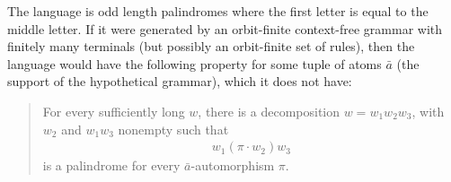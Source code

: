 	

	
	




	

 {The language is odd length palindromes where the first letter is equal to the middle letter. If it were generated by an orbit-finite context-free grammar with finitely many terminals (but possibly an orbit-finite set of rules), then the language would have the following property for some tuple of atoms $\bar a$ (the support of the hypothetical grammar), which it does not have:
	  \begin{quote}
	  	For every sufficiently long  $w$, there is a decomposition $w=w_1 w_2 w_3$, with $w_2$ and $w_1w_3$ nonempty  such that
	\begin{align*}
		w_1( \pi \cdot w_2) w_3  
	\end{align*}
	is a palindrome for every $\bar a$-automorphism $\pi$.
	  \end{quote}		}
	  
